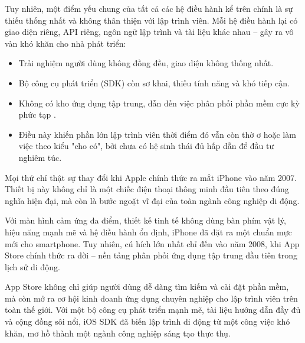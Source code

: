   \begin{flushleft}
  \hspace*{0.8cm}Tuy nhiên, một điểm yếu chung của tất cả các hệ điều hành kể trên chính là sự thiếu thống nhất và không thân thiện với lập trình viên. Mỗi hệ điều hành lại có giao diện riêng, API riêng, ngôn ngữ lập trình và tài liệu khác nhau – gây ra vô vàn khó khăn cho nhà phát triển:
  \begin{itemize}
  \item Trải nghiệm người dùng không đồng đều, giao diện không thống nhất.
  \item Bộ công cụ phát triển (SDK) còn sơ khai, thiếu tính năng và khó tiếp cận.
  \item Không có kho ứng dụng tập trung, dẫn đến việc phân phối phần mềm cực kỳ phức tạp \cite{pre-appstore-dev}.
  \item[]Điều này khiến phần lớn lập trình viên thời điểm đó vẫn còn thờ ơ hoặc làm việc theo kiểu "cho có", bởi chưa có hệ sinh thái đủ hấp dẫn để đầu tư nghiêm túc.
  \end{itemize}
  \end{flushleft}
  
  \begin{flushleft}
  \hspace*{0.8cm}Mọi thứ chỉ thật sự thay đổi khi Apple chính thức ra mắt iPhone vào năm 2007. Thiết bị này không chỉ là một chiếc điện thoại thông minh đầu tiên theo đúng nghĩa hiện đại, mà còn là bước ngoặt vĩ đại của toàn ngành công nghiệp di động.
  \end{flushleft}
  
  \begin{flushleft}
  \hspace*{0.8cm}Với màn hình cảm ứng đa điểm, thiết kế tinh tế không dùng bàn phím vật lý, hiệu năng mạnh mẽ và hệ điều hành ổn định, iPhone đã đặt ra một chuẩn mực mới cho smartphone. Tuy nhiên, cú hích lớn nhất chỉ đến vào năm 2008, khi App Store chính thức ra đời – nền tảng phân phối ứng dụng tập trung đầu tiên trong lịch sử di động.
  \end{flushleft}
  
  \begin{flushleft}
  \hspace*{0.8cm}App Store không chỉ giúp người dùng dễ dàng tìm kiếm và cài đặt phần mềm, mà còn mở ra cơ hội kinh doanh ứng dụng chuyên nghiệp cho lập trình viên trên toàn thế giới. Với một bộ công cụ phát triển mạnh mẽ, tài liệu hướng dẫn đầy đủ và cộng đồng sôi nổi, iOS SDK đã biến lập trình di động từ một công việc khó khăn, mơ hồ thành một ngành công nghiệp sáng tạo thực thụ.
  \end{flushleft}
  
